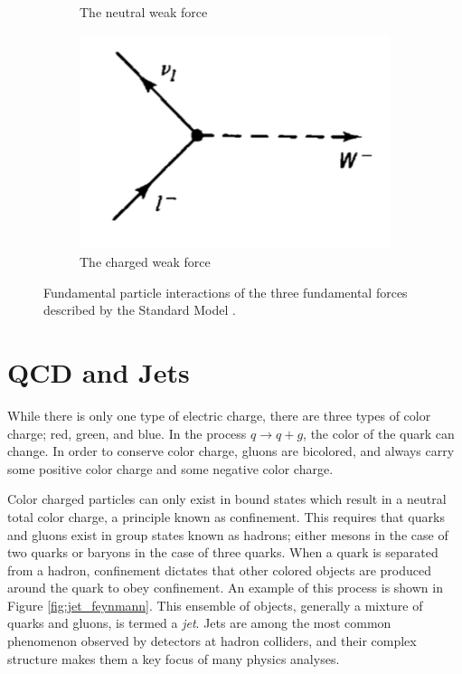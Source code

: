 \begin{figure}
\begin{subfigure}[b]{0.4\textwidth}
         \caption{The neutral weak force}
     \end{subfigure}
     \hfill  
     \begin{subfigure}[b]{0.4\textwidth}
         \centering
         \includegraphics[width=\textwidth]{figures/ch1/weak_charged.png}
         \caption{The charged weak force}
     \end{subfigure} 
     \caption{Fundamental particle interactions of the three fundamental forces described by the Standard Model \cite{griffiths}. }
     \label{fig:force_feynmann}
\end{figure}

\section{QCD and Jets}
\label{sec:QCD}
While there is only one type of electric charge, there are three types of color charge; red, green, and blue. In the process $q \rightarrow q+g$, the color of the quark can change. In order to conserve color charge, gluons are bicolored, and always carry some positive color charge and some negative color charge. \par

Color charged particles can only exist in bound states which result in a neutral total color charge, a principle known as confinement. This requires that quarks and gluons exist in group states known as hadrons; either mesons in the case of two quarks or baryons in the case of three quarks. When a quark is separated from a hadron, confinement dictates that other colored objects are produced around the quark to obey confinement. An example of this process is shown in Figure \ref{fig:jet_feynmann}. This ensemble of objects, generally a mixture of quarks and gluons, is termed a \textit{jet}. Jets are among the most common phenomenon observed by detectors at hadron colliders, and their complex structure makes them a key focus of many physics analyses. 

